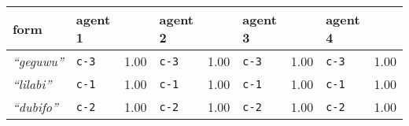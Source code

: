 
{\footnotesize\renewcommand{\arraystretch}{1.5}
\begin{tabular}{@{}p{1.2cm}|p{1.6cm}@{}p{0.8cm}@{}|p{1.6cm}@{}p{0.8cm}@{}|p{1.6cm}@{}p{0.8cm}@{}|p{1.6cm}@{}p{0.8cm}@{}}
form & agent 1 &  & agent 2 &  & agent 3 &  & agent 4 & \\
\hline
\textit{``geguwu''}&\texttt{c-3}
&1.00&\texttt{c-3}
&1.00&\texttt{c-3}
&1.00&\texttt{c-3}
&1.00\\
\hline
\textit{``lilabi''}&\texttt{c-1}
&1.00&\texttt{c-1}
&1.00&\texttt{c-1}
&1.00&\texttt{c-1}
&1.00\\
\hline
\textit{``dubifo''}&\texttt{c-2}
&1.00&\texttt{c-2}
&1.00&\texttt{c-2}
&1.00&\texttt{c-2}
&1.00\\
\end{tabular}}

